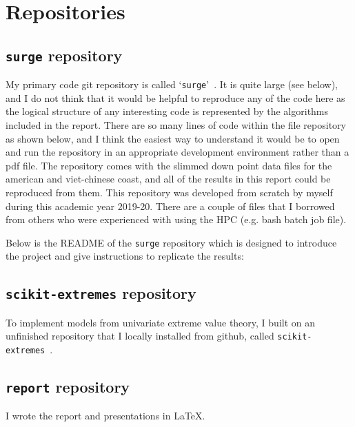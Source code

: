 \section{Repositories}
\subsection{\texttt{surge} repository}

My primary code git repository is called `\texttt{surge}'~\cite{gitlab}.
It is quite large (see below), and I do not think that it would be helpful to reproduce any of the code here
as the logical structure of any interesting code is represented by the
algorithms included in the report. There are so many lines of code within the file
repository as shown below, and I think the easiest way to understand it would be to open
and run the repository in an appropriate development environment rather than a pdf file.
The repository comes with the slimmed down point data files for the american and
viet-chinese coast, and all of the results in this report could be reproduced from them.
This repository was developed from scratch by myself during this academic year 2019-20.
There are a couple of files that I borrowed from others who were
experienced with using the HPC (e.g. bash batch job file).




Below is the README of the \texttt{surge} repository which is designed to
introduce the project and give instructions to replicate the results:



\subsection{\texttt{scikit-extremes} repository}

To implement models from univariate extreme value theory, I built
on an unfinished repository that I locally installed from github,
called \texttt{scikit-extremes}~\cite{skextremes}.



\subsection{\texttt{report} repository}

I wrote the report and presentations in \LaTeX.


